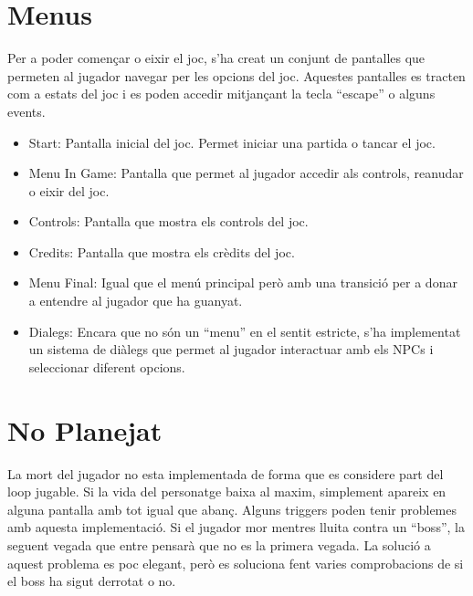 \documentclass[a4paper,12pt]{article}
\begin{document}
\section{Menus}
Per a poder començar o eixir el joc, s'ha creat un conjunt de pantalles que permeten al jugador navegar per les opcions del joc. Aquestes pantalles es tracten com a estats del joc i es poden accedir mitjançant la tecla ``escape'' o alguns events.   
\begin{itemize}
    \item Start: Pantalla inicial del joc. Permet iniciar una partida o tancar el joc.
    \item Menu In Game: Pantalla que permet al jugador accedir als controls, reanudar o eixir del joc.
    \item Controls: Pantalla que mostra els controls del joc.
    \item Credits: Pantalla que mostra els crèdits del joc.
    \item Menu Final: Igual que el menú principal però amb una transició per a donar a entendre al jugador que ha guanyat.
    \item Dialegs: Encara que no són un ``menu'' en el sentit estricte, s'ha implementat un sistema de diàlegs que permet al jugador interactuar amb els NPCs i seleccionar diferent opcions.
\end{itemize}

\section{No Planejat}
La mort del jugador no esta implementada de forma que es considere part del loop jugable. Si la vida del personatge baixa al maxim, simplement apareix en alguna pantalla amb tot igual que abanç. Alguns triggers poden tenir problemes amb aquesta implementació. Si el jugador mor mentres lluita contra un ``boss'', la seguent vegada que entre pensarà que no es la primera vegada. La solució a aquest problema es poc elegant, però es soluciona fent varies comprobacions de si el boss ha sigut derrotat o no.






\end{document}
